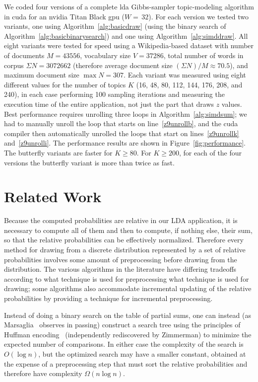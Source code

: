 \documentclass[10pt,nohyperref]{sigplanconf}
\begin{document}
We coded four versions of a complete {\sc lda} Gibbs-sampler topic-modeling algorithm in {\sc cuda} for an {\sc nvidia}
Titan Black {\sc gpu} ($W\mathbin=\,32$).  For each version we tested two variants, one using Algorithm~\ref{alg:basicdraw} (using the binary search
of Algorithm~\ref{alg:basicbinarysearch}) and one using Algorithm~\ref{alg:simddraw}.  All eight variants
were tested for speed using a Wikipedia-based
dataset with number of documents $M=43556$, vocabulary size $V=37286$, total number of words in corpus $\Sigma N=3072662$
(therefore average document size $(\Sigma N)/M \approx 70.5$),
and maximum document size $\max N=307$.  Each variant was measured using eight different values for the number of topics $K$ (16, 48, 80, 112, 144, 176, 208, and 240),
in each case performing 100 sampling iterations and measuring the execution time of the entire application, not just the
part that draws $z$ values.  Best performance requires unrolling three loops in Algorithm~\ref{alg:simdsum};
we had to manually unroll the loop that starts on line~\ref{z9unrollb}, and the {\sc cuda} compiler then automatically
unrolled the loops that start on lines~\ref{z9unrollk} and~\ref{z9unrolli}.
The performance results are shown in Figure~\ref{fig:performance}.
The butterfly variants are faster for $K \geq 80$.  For $K \geq 200$,
for each of the four versions the butterfly variant is more than twice as fast.

\section{Related Work}

Because the computed probabilities are relative in our LDA application, it is necessary to compute all of them and then to compute,
if nothing else, their sum, so that the relative probabilities can be effectively normalized.  Therefore every method for
drawing from a discrete distribution represented by a set of relative probabilities
involves some amount of preprocessing before drawing from the distribution.
The various algorithms in the literature have differing tradeoffs according to what technique is used for preprocessing
what technique is used for drawing; some algorithms also accommodate incremental updating of the relative probabilities
by providing a technique for incremental preprocessing.

Instead of doing a binary search on the table of partial sums, one can instead (as Marsaglia~\cite{Marsaglia-1963} observes in passing)
construct a search tree using the principles of Huffman encoding~\cite{Huffman-1952} (independently rediscovered
by Zimmerman\cite{Zimmerman-1959}) to minimize the expected number of comparisons.  In either case
the complexity of the search is $O(\log n)$, but the optimized search may have a smaller constant,
obtained at the expense of a preprocessing step that must sort the relative probabilities and
therefore have complexity $\Omega(n \log n)$.
\end{document}
